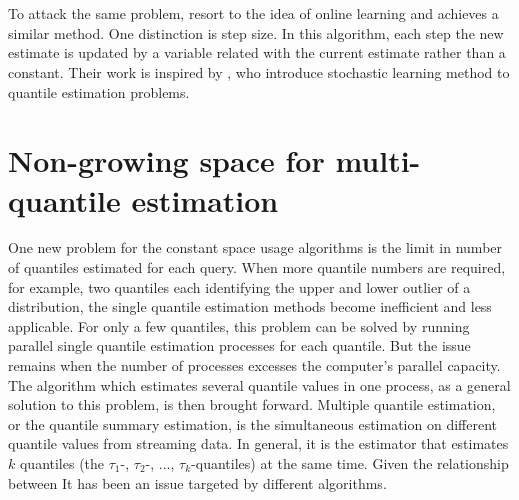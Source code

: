\\\\
To attack the same problem, \citeauthor{yazidiQuantileEstimationDynamic2016}\cite{yazidiQuantileEstimationDynamic2016} resort to the idea of online learning and achieves a similar method. 
One distinction is step size. In this algorithm, each step the new estimate is updated by a variable related with the current estimate rather than a constant.
Their work is inspired by \citeauthor{tierneySpaceEfficientRecursiveProcedure1983}\cite{tierneySpaceEfficientRecursiveProcedure1983}, who introduce stochastic learning method to quantile estimation problems. 



\section{Non-growing space for multi-quantile estimation}
\label{multiquantile}
One new problem for the constant space usage algorithms is the limit in number of quantiles estimated for each query.
When more quantile numbers are required, for example, two quantiles each identifying the upper and lower outlier of a distribution, the single quantile estimation methods become inefficient and less applicable.
For only a few quantiles, this problem can be solved by running parallel single quantile estimation processes for each quantile. But the issue remains when the number of processes excesses the computer's parallel capacity.
The algorithm which estimates several quantile values in one process, as a general solution to this problem, is then brought forward.
Multiple quantile estimation, or the quantile summary estimation, is the simultaneous estimation on different quantile values from streaming data. 
In general, it is the estimator that estimates $k$ quantiles (the $\tau_1$-, $\tau_2$-, $...$, $\tau_k$-quantiles) at the same time.
Given the relationship between 
It has been an issue targeted by different algorithms.



